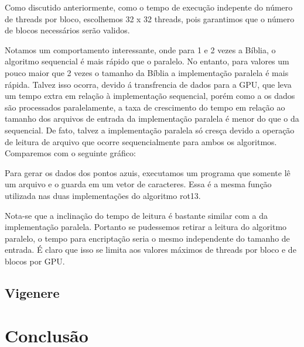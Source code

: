 \documentclass[12pt]{article}
\begin{document}
Como discutido anteriormente, como o tempo de execução indepente do número de threads por bloco, escolhemos 32 x 32 threads, pois garantimos que o número de blocos necessários serão validos.

Notamos um comportamento interessante, onde para 1 e 2 vezes a Bíblia, o algoritmo sequencial é mais rápido que o paralelo. No entanto, para valores um pouco maior que 2 vezes o tamanho da Bíblia a implementação paralela é mais rápida. Talvez isso ocorra, devido á transfrencia de dados para a GPU, que leva um tempo extra em relação à implementação sequencial, porém como a os dados são processados paralelamente, a taxa de crescimento do tempo em relação ao tamanho dos arquivos de entrada da implementação paralela é menor do que o da sequencial. De fato, talvez a implementação paralela só cresça devido a operação de leitura de arquivo que ocorre sequencialmente para ambos os algoritmos. Comparemos com o seguinte gráfico:

\begin{figure}[H]
\end{figure}

Para gerar os dados dos pontos azuis, executamos um programa que somente lê um arquivo e o guarda em um vetor de caracteres. Essa é a mesma função utilizada nas duas implementações do algoritmo rot13. 

Nota-se que a inclinação do tempo de leitura é bastante similar com a da implementação paralela. Portanto se pudessemos retirar a leitura do algoritmo paralelo, o tempo para encriptação seria o mesmo independente do tamanho de entrada. É claro que isso se limita aos valores máximos de threads por bloco e de blocos por GPU. 

\subsection{Vigenere}


\newpage
\section{Conclusão}
\end{document}
